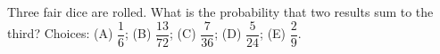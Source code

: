Three fair dice are rolled. What is the probability that two results sum to the third? Choices: (A) $\dfrac{1}{6}$; (B) $\dfrac{13}{72}$; (C) $\dfrac{7}{36}$; (D) $\dfrac{5}{24}$; (E) $\dfrac{2}{9}$.
